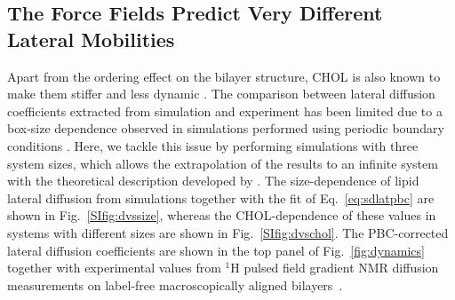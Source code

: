 \documentclass[journal=jctcce]{achemso}
\begin{document}
\subsection{The Force Fields Predict Very Different Lateral Mobilities}

Apart from the ordering effect on the bilayer structure, CHOL is also known to make them stiffer and less dynamic \cite{rog2009ordering,filippov2003effect,filippov2003influence}. The comparison between lateral diffusion coefficients extracted from simulation and experiment has been limited due to a box-size dependence observed in simulations performed using periodic boundary conditions \cite{vogele2016divergent,vogele2018hydrodynamics,camley2015strong}. Here, we tackle this issue by performing simulations with three system sizes, which allows the extrapolation of the results to an infinite system with the theoretical description developed by \citeauthor{vogele2016divergent} \cite{vogele2018hydrodynamics,vogele2018hydrodynamics}. The size-dependence of lipid lateral diffusion from simulations together with the fit of Eq.~\eqref{eq:sdlatpbc} are shown in Fig.~\ref{SIfig:dvssize}, whereas the CHOL-dependence of these values in systems with different sizes are shown in Fig.~\ref{SIfig:dvschol}. The PBC-corrected lateral diffusion coefficients are shown in the top panel of Fig.~\ref{fig:dynamics} together with experimental values from $^1$H pulsed field gradient NMR diffusion measurements on label-free macroscopically aligned bilayers~\cite{filippov2003influence,filippov2003effect}.  
\end{document}
